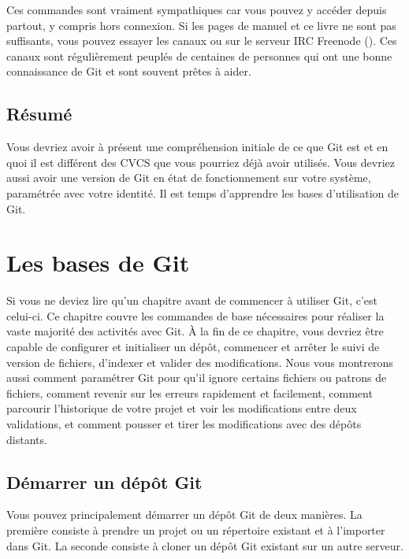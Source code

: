 Ces commandes sont vraiment sympathiques car vous pouvez y accéder depuis partout, y compris hors connexion.
Si les pages de manuel et ce livre ne sont pas suffisants, vous pouvez essayer les canaux  ou  sur le serveur IRC Freenode ().
Ces canaux sont régulièrement peuplés de centaines de personnes qui ont une bonne connaissance de Git et sont souvent prêtes à aider.

\subsection{Résumé}

Vous devriez avoir à présent une compréhension initiale de ce que Git est et en quoi il est différent des CVCS que vous pourriez déjà avoir utilisés.
Vous devriez aussi avoir une version de Git en état de fonctionnement sur votre système, paramétrée avec votre identité.
Il est temps d'apprendre les bases d'utilisation de Git.


\section{Les bases de Git}
\label{sec:git:basics}

Si vous ne deviez lire qu'un chapitre avant de commencer à utiliser Git, c'est celui-ci.
Ce chapitre couvre les commandes de base nécessaires pour réaliser la vaste majorité des activités avec Git.
À la fin de ce chapitre, vous devriez être capable de configurer et initialiser un dépôt, commencer et arrêter le suivi de version de fichiers, d'indexer et valider des modifications.
Nous vous montrerons aussi comment paramétrer Git pour qu'il ignore certains fichiers ou patrons de fichiers, comment revenir sur les erreurs rapidement et facilement, comment parcourir l'historique de votre projet et voir les modifications entre deux validations, et comment pousser et tirer les modifications avec des dépôts distants.

\subsection{Démarrer un dépôt Git}
\label{sec:git:getting_a_repo}

Vous pouvez principalement démarrer un dépôt Git de deux manières.
La première consiste à prendre un projet ou un répertoire existant et à l'importer dans Git.
La seconde consiste à cloner un dépôt Git existant sur un autre serveur.


